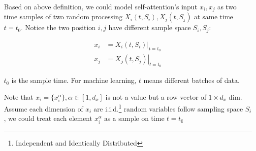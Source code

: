 
Based on above definition, we could model self-attention's input $x_i, x_j$ as two time samples of two random processing $X_i(t, S_{i}), X_j(t, S_{j})$ at same time $t=t_0$. Notice the two position $i,j$ have different sample space $S_i, S_j$:

\begin{align}
    x_i &= \left. X_i(t, S_i)\right\vert_{t=t_0}\\
    x_j &= \left. X_j(t, S_j)\right\vert_{t=t_0}
\end{align}

$t_0$ is the sample time. For machine learning, $t$ means different batches of data.

Note that $x_i=\{x_i^{\alpha}\},\alpha\in[1,d_x]$ is not a value but a row vector of $1\times d_x$ dim. Assume each dimension of $x_i$ are i.i.d.\footnote{Independent and Identically Distributed} random variables follow sampling space $S_i$, we could treat each element $x_i^{\alpha}$ as a sample on time $t=t_0$
    